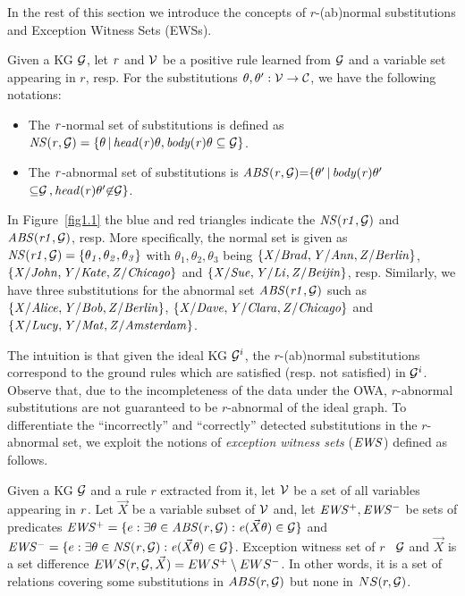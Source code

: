 In the rest of this section we introduce the concepts of $r$-(ab)normal substitutions and Exception Witness Sets (EWSs).

\begin{definition}\label{sec:rulelearn}
Given a KG $\mathcal{G}$, let $\mathit{r}$ and $\mathcal{V}$ be a positive rule learned from $\mathcal{G}$ and a variable set appearing in $r$, resp. For the substitutions $\theta,\theta':\mathcal{V} \rightarrow \mathcal{C}$, we have the following notations:

\begin{itemize}
\item The $\mathit{r}$-normal set of substitutions is defined as $\mathit{NS(r, \mathcal{G})=\{\theta\, |\, head(r)\theta,body(r)\theta \subseteq \mathcal{G}\}}$.
\item The $\mathit{r}$-abnormal set of substitutions is $\mathit{ABS(r, \mathcal{G}){=}\{\theta'\, |\, body(r)\theta'}$\\ $\mathit{{\subseteq} \mathcal{G}\,{,}\,head(r)\theta' {\not \in} \mathcal{G}\}}$.
\end{itemize}
\end{definition}

\begin{example}\label{ex:abns}
In Figure~\ref{fig1.1} the blue and red triangles indicate the $\mathit{NS(r1,\mathcal{G})}$ and $\mathit{ABS(r1,\mathcal{G})}$, resp. More specifically, the normal set is given as $\mathit{NS(r1,\mathcal{G})}=\{\mathit{\theta_1,\theta_2,\theta_3}\}$ with $\theta_1,\theta_2,\theta_3$ being $\{\mathit{X/Brad,Y/Ann,Z/Berlin}\}$, $\{\mathit{X/John,Y/Kate,Z/Chicago}\}$ and $\{\mathit{X/Sue,Y/Li,Z/Beijin}\}$, resp. Similarly, we have three substitutions for the abnormal set $\mathit{ABS(r1,\mathcal{G})}$ such as $\{\mathit{X/Alice,Y/Bob,Z/Berlin}\}$, $\{\mathit{X/Dave,Y/Clara,Z/Chicago}\}$ and $\{\mathit{X/Lucy,Y/Mat,Z/Amsterdam}\}$.
\end{example}

The intuition is that given the ideal KG $\mathcal{G}^i$, the $r$-(ab)normal substitutions correspond to the ground rules which are satisfied (resp. not satisfied) in $\mathcal{G}^i$. Observe that, due to the incompleteness of the data under the OWA, $r$-abnormal substitutions are not guaranteed to be $r$-abnormal of the ideal graph. To differentiate the ``incorrectly'' and ``correctly'' detected substitutions in the $r$-abnormal set, we exploit the notions of \emph{exception witness sets} ($\mathit{EWS}$) defined as follows.

\begin{definition} \label{def:ews}
Given a KG $\mathcal{G}$ and a rule $r$ extracted from it, let $\mathcal{V}$ be a set of all variables appearing in $\mathit{r}$. Let $\vec{X}$ be a variable subset of $\mathcal{V}$ and, let $\mathit{EWS^+, EWS^-}$ be sets of predicates $\mathit{EWS^+}=\{e: \exists \theta \in \mathit{ABS(r,\mathcal{G})}: \mathit{e}(\vec{X}\theta)\in \mathcal{G}\}$ and $\mathit{EWS^-}=\{e: \exists \theta \in \mathit{NS(r,\mathcal{G})}: \mathit{e}(\vec{X}\theta)\in \mathcal{G}\}$. Exception witness set of $r$ \wrt\ $\mathcal{G}$ and $\vec{X}$ is a set difference $EWS(r,\mathcal{G},\vec{X})=EWS^+ \setminus EWS^-$. In other words, it is a set of relations covering some substitutions in $ABS(r, \mathcal{G})$ but none in $NS(r, \mathcal{G})$.
\end{definition}

